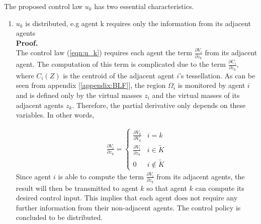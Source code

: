 \documentclass[journal]{IEEEtran}
\newcommand{\threepartdef}[6]
{
	\left\{
	\begin{array}{ll}
		#1 & #2 \\
		#3 & #4 \\
		#5 & #6 
	\end{array}
	\right.
}
\begin{document}
	The proposed control law $u_k$ has two essential characteristics.
	\begin{enumerate} [leftmargin=*]
		\item $ u_k $ is distributed, e.g agent k requires only the information from its adjacent agents \\
		\textbf{Proof.}	\\
		The control law (\ref{eqn:u_k}) requires each agent  the term $\frac{\partial V_i}{\partial z_k}$ from its adjacent agent. The computation of this term is complicated due to the term $\frac{\partial C_i}{\partial z_k}$, where $C_i(Z)$ is the centroid of the adjacent agent $i$'s tessellation. As can be seen from appendix [\ref{appendix:BLF}], the region $\Omega_i$ is monitored by agent $i$ and is defined only by the virtual masses $z_i$ and the virtual masses of its adjacent agents $z_k$. Therefore, the partial derivative only depends on these variables. In other words,
		
		\begin{equation} \label{eqn:dVidz}
		\begin{split}
		\frac{\partial V_i}{\partial z_k} = \threepartdef	{\frac{\partial V_k}{\partial V_k}}			{i = k}
		{\frac{\partial V_i}{\partial z_k}}			{i \in \tilde{K}}
		{0}											{i \notin \tilde{K}} 												
		\end{split}
		\end{equation}
		Since agent $i$ is able to compute the term $\frac{\partial V_i}{\partial z_k}$ from its adjacent agents, the result will then be transmitted to agent $k$ so that agent $k$ can compute its desired control input. This implies that each agent does not require any further information from their non-adjacent agents. The control policy is concluded to be distributed.
		

\end{enumerate}
\end{document}
